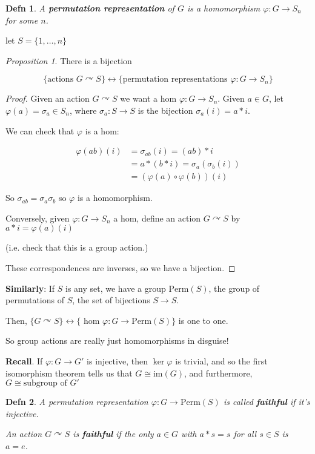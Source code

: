 \documentclass[12pt]{article}
\def\Perm{\text{Perm}}
\def\phi{\varphi}
\def\acts{\curvearrowright} %
\def\im{\text{im}}
\newtheorem{definition}{Defn}
\theoremstyle{remark}
\newtheorem{proposition}{Proposition}
\theoremstyle{remark}
\theoremstyle{remark}
\theoremstyle{remark}
\theoremstyle{remark}
\begin{document}
\begin{definition}
  A {\bf permutation representation} of $G$ is a homomorphism $\varphi: G \to
  S_n$ for some $n$.
\end{definition}

let $S = \{1, \dots, n\}$

\begin{proposition}
  There is a bijection

  \[
    \{\text{actions } G \acts S\} \leftrightarrow \{\text{permutation
    representations } \varphi: G \to S_n \}
  \]
\end{proposition}

\begin{proof}
  Given an action $G \acts S$ we want a hom $\varphi: G \to S_n$.
  Given $a \in G$, let $\varphi(a) = \sigma_a \in S_n$, where $\sigma_a: S \to S$
  is the bijection $\sigma_a(i) = a * i$.

  We can check that $\varphi$ is a hom:

  \begin{align*}
    \varphi(ab)(i) &= \sigma_{ab}(i) = (ab) * i \\
                   &= a * (b * i) = \sigma_a(\sigma_b(i)) \\
                   &= (\varphi(a) \circ \varphi(b))(i)
  \end{align*}

  So $\sigma_{ab} = \sigma_a \sigma_b$ so $\varphi$ is a homomorphism.

  Conversely, given $\varphi: G \to S_n$ a hom, define an action $G \acts S$ by $a
  * i = \varphi(a) (i)$

  (i.e. check that this is a group action.)

  These correspondences are inverses, so we have a bijection.
\end{proof}

{\bf Similarly}: If $S$ is any set, we have a group $\Perm(S)$, the group of
permutations of $S$, the set of bijections $S \to S$.

Then, $\{G \acts S\} \leftrightarrow \{\text{ hom } \varphi: G \to \Perm(S)\}$
is one to one.

So group actions are really just homomorphisms in disguise!

{\bf Recall}. If $\varphi: G \to G'$ is injective, then $\ker \phi$ is trivial,
and so the first isomorphism theorem tells us that $G \cong \im(G)$, and
furthermore, $G \cong \text{subgroup of } G'$

\begin{definition}
  A permutation representation $\varphi: G \to \Perm(S)$ is called {\bf
  faithful} if it's injective.

  An action $G \acts S$ is {\bf faithful} if the only $a \in G$ with $a * s = s$
  for all $s \in S$ is $a = e$.
\end{definition}
\end{document}
